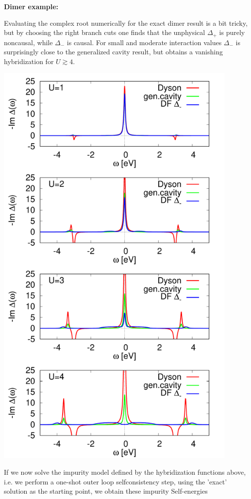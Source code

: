 \documentclass[12pt,a4paper]{scrartcl}
\numberwithin{equation}{section}
\begin{document}
\bigskip

\textbf{Dimer example:}

Evaluating the complex root numerically for the exact dimer result is a bit tricky, but by choosing the right branch cuts
one finds that the unphysical $\Delta_{+}$ is purely noncausal, while $\Delta_{-}$ is causal.
For small and moderate interaction values $\Delta_{-}$ is surprisingly close to the generalized cavity result,
but obtains a vanishing hybridization for $U\gtrsim 4$.

\includegraphics[width=0.9\textwidth]{figs/bathNonlocFromDMFTderiv/DF/DF_hybridization.pdf}

\clearpage

If we now solve the impurity model defined by the hybridization functions above, i.e. we perform a one-shot outer loop
selfconsistency step, using the 'exact' solution as the starting point, we obtain these impurity Self-energies
\end{document}

